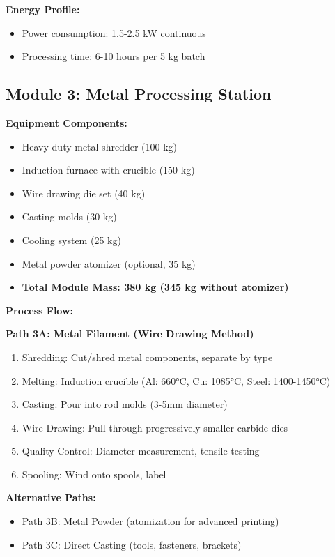\documentclass[12pt, a4paper]{article}
\begin{document}
\textbf{Energy Profile:}
\begin{itemize}
    \item Power consumption: 1.5-2.5 kW continuous
    \item Processing time: 6-10 hours per 5 kg batch
\end{itemize}

\subsection{Module 3: Metal Processing Station}

\textbf{Equipment Components:}
\begin{itemize}
    \item Heavy-duty metal shredder (100 kg)
    \item Induction furnace with crucible (150 kg)
    \item Wire drawing die set (40 kg)
    \item Casting molds (30 kg)
    \item Cooling system (25 kg)
    \item Metal powder atomizer (optional, 35 kg)
    \item \textbf{Total Module Mass: 380 kg (345 kg without atomizer)}
\end{itemize}

\textbf{Process Flow:}

\textbf{Path 3A: Metal Filament (Wire Drawing Method)}
\begin{enumerate}
    \item Shredding: Cut/shred metal components, separate by type
    \item Melting: Induction crucible (Al: 660°C, Cu: 1085°C, Steel: 1400-1450°C)
    \item Casting: Pour into rod molds (3-5mm diameter)
    \item Wire Drawing: Pull through progressively smaller carbide dies
    \item Quality Control: Diameter measurement, tensile testing
    \item Spooling: Wind onto spools, label
\end{enumerate}

\textbf{Alternative Paths:}
\begin{itemize}
    \item Path 3B: Metal Powder (atomization for advanced printing)
    \item Path 3C: Direct Casting (tools, fasteners, brackets)
\end{itemize}
\end{document}
